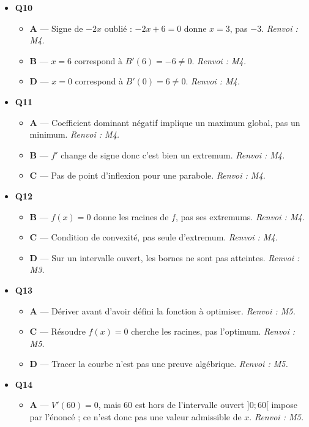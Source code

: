 \begin{itemize}
\begin{itemize}
  \end{itemize}
  \item \textbf{Q10}
  \begin{itemize}
    \item \textbf{A} — Signe de $-2x$ oublié : $-2x+6=0$ donne $x=3$, pas $-3$. \emph{Renvoi : M4.}
    \item \textbf{B} — $x=6$ correspond à $B'(6) = -6 \neq 0$. \emph{Renvoi : M4.}
    \item \textbf{D} — $x=0$ correspond à $B'(0) = 6 \neq 0$. \emph{Renvoi : M4.}
  \end{itemize}
  \item \textbf{Q11}
  \begin{itemize}
    \item \textbf{A} — Coefficient dominant négatif implique un maximum global, pas un minimum. \emph{Renvoi : M4.}
    \item \textbf{B} — $f'$ change de signe donc c'est bien un extremum. \emph{Renvoi : M4.}
    \item \textbf{C} — Pas de point d'inflexion pour une parabole. \emph{Renvoi : M4.}
  \end{itemize}
  \item \textbf{Q12}
  \begin{itemize}
    \item \textbf{B} — $f(x)=0$ donne les racines de $f$, pas ses extremums. \emph{Renvoi : M4.}
    \item \textbf{C} — Condition de convexité, pas seule d'extremum. \emph{Renvoi : M4.}
    \item \textbf{D} — Sur un intervalle ouvert, les bornes ne sont pas atteintes. \emph{Renvoi : M3.}
  \end{itemize}
  \item \textbf{Q13}
  \begin{itemize}
    \item \textbf{A} — Dériver avant d'avoir défini la fonction à optimiser. \emph{Renvoi : M5.}
    \item \textbf{C} — Résoudre $f(x)=0$ cherche les racines, pas l'optimum. \emph{Renvoi : M5.}
    \item \textbf{D} — Tracer la courbe n'est pas une preuve algébrique. \emph{Renvoi : M5.}
  \end{itemize}
  \item \textbf{Q14}
  \begin{itemize}
    \item \textbf{A} — $V'(60)=0$, mais $60$ est hors de l'intervalle ouvert $]0;60[$ impose par l'énoncé ; ce n'est donc pas une valeur admissible de $x$. \emph{Renvoi : M5.}

\end{itemize}
\end{itemize}
